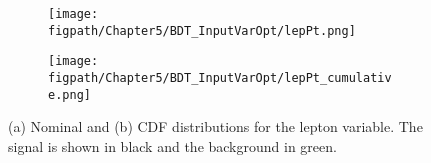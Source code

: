 \begin{figure}[!hbt]
    \centering
    \begin{subfigure}[t]{0.48\textwidth}
        \texttt{[image: \\figpath/Chapter5/BDT\_InputVarOpt/lepPt.png]}
        \caption{}
        \label{fig:lepPt_nominal}
    \end{subfigure}
    \begin{subfigure}[t]{0.48\textwidth}
        \texttt{[image: \\figpath/Chapter5/BDT\_InputVarOpt/lepPt\_cumulative.png]}
        \caption{}
        \label{fig:lepPt_CDF}
    \end{subfigure}
    \caption{(a) Nominal and (b) CDF distributions for the lepton \pt variable. The signal is shown in black and the background in green.}
    \label{fig:CDF_example}
\end{figure}

